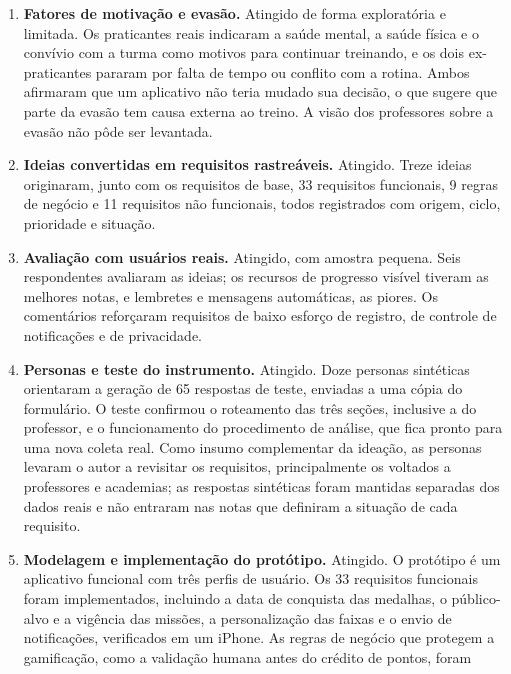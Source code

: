\begin{enumerate}
  \item \textbf{Fatores de motivação e evasão.} Atingido de forma
        exploratória e limitada. Os praticantes reais indicaram a saúde
        mental, a saúde física e o convívio com a turma como motivos para
        continuar treinando, e os dois ex-praticantes pararam por falta de
        tempo ou conflito com a rotina. Ambos afirmaram que um aplicativo
        não teria mudado sua decisão, o que sugere que parte da evasão tem
        causa externa ao treino. A visão dos professores sobre a evasão não
        pôde ser levantada.
  \item \textbf{Ideias convertidas em requisitos rastreáveis.} Atingido.
        Treze ideias originaram, junto com os requisitos de base, 33
        requisitos funcionais, 9 regras de negócio e 11 requisitos não
        funcionais, todos registrados com origem, ciclo, prioridade e
        situação.
  \item \textbf{Avaliação com usuários reais.} Atingido, com amostra
        pequena. Seis respondentes avaliaram as ideias; os recursos de
        progresso visível tiveram as melhores notas, e lembretes e
        mensagens automáticas, as piores. Os comentários reforçaram
        requisitos de baixo esforço de registro, de controle de
        notificações e de privacidade.
  \item \textbf{Personas e teste do instrumento.} Atingido. Doze personas
        sintéticas orientaram a geração de 65 respostas de teste, enviadas
        a uma cópia do formulário. O teste confirmou o roteamento das três
        seções, inclusive a do professor, e o funcionamento do procedimento
        de análise, que fica pronto para uma nova coleta real. Como insumo
        complementar da ideação, as personas levaram o autor a revisitar
        os requisitos, principalmente os voltados a professores e
        academias; as respostas sintéticas foram mantidas separadas dos
        dados reais e não entraram nas notas que definiram a situação de
        cada requisito.
  \item \textbf{Modelagem e implementação do protótipo.} Atingido. O
        protótipo é um aplicativo funcional com três perfis de usuário. Os 33
        requisitos funcionais foram implementados, incluindo a data de
        conquista das medalhas, o público-alvo e a vigência das missões, a
        personalização das faixas e o envio de notificações, verificados
        em um iPhone. As regras de negócio que protegem a gamificação,
        como a validação humana antes do crédito de pontos, foram

\end{enumerate}
